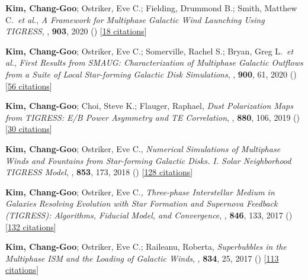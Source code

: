 \item[{43.}]\textbf{Kim, Chang-Goo}; Ostriker, Eve C.; Fielding, Drummond B.; Smith, Matthew C.~\textit{et al.}, \textit{A Framework for Multiphase Galactic Wind Launching Using TIGRESS}, , \textbf{903}, 2020 () [\href{http://adsabs.harvard.edu/abs/2020ApJ...903L..34K}{18 citations}]

\item[{42.}]\textbf{Kim, Chang-Goo}; Ostriker, Eve C.; Somerville, Rachel S.; Bryan, Greg L.~\textit{et al.}, \textit{First Results from SMAUG: Characterization of Multiphase Galactic Outflows from a Suite of Local Star-forming Galactic Disk Simulations}, , \textbf{900}, 61, 2020 () [\href{http://adsabs.harvard.edu/abs/2020ApJ...900...61K}{56 citations}]

\item[{41.}]\textbf{Kim, Chang-Goo}; Choi, Steve K.; Flauger, Raphael, \textit{Dust Polarization Maps from TIGRESS: E/B Power Asymmetry and TE Correlation}, , \textbf{880}, 106, 2019 () [\href{http://adsabs.harvard.edu/abs/2019ApJ...880..106K}{30 citations}]

\item[{40.}]\textbf{Kim, Chang-Goo}; Ostriker, Eve C., \textit{Numerical Simulations of Multiphase Winds and Fountains from Star-forming Galactic Disks. I. Solar Neighborhood TIGRESS Model}, , \textbf{853}, 173, 2018 () [\href{http://adsabs.harvard.edu/abs/2018ApJ...853..173K}{128 citations}]

\item[{39.}]\textbf{Kim, Chang-Goo}; Ostriker, Eve C., \textit{Three-phase Interstellar Medium in Galaxies Resolving Evolution with Star Formation and Supernova Feedback (TIGRESS): Algorithms, Fiducial Model, and Convergence}, , \textbf{846}, 133, 2017 () [\href{http://adsabs.harvard.edu/abs/2017ApJ...846..133K}{132 citations}]

\item[{38.}]\textbf{Kim, Chang-Goo}; Ostriker, Eve C.; Raileanu, Roberta, \textit{Superbubbles in the Multiphase ISM and the Loading of Galactic Winds}, , \textbf{834}, 25, 2017 () [\href{http://adsabs.harvard.edu/abs/2017ApJ...834...25K}{113 citations}]

